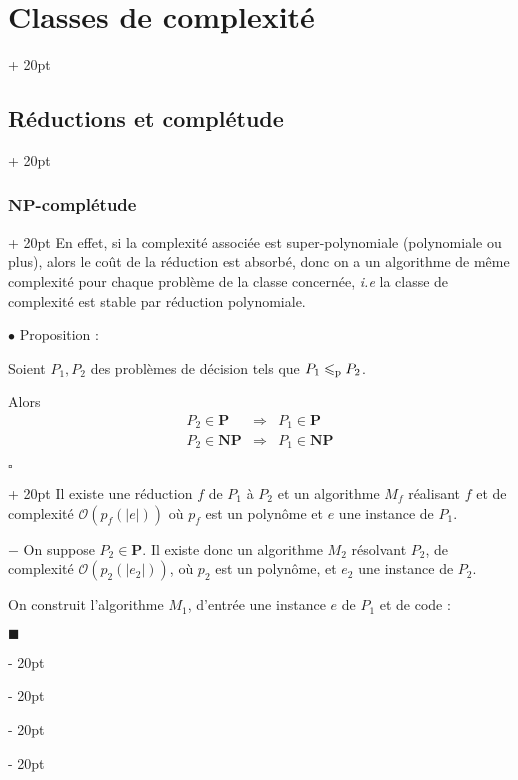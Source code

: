 \documentclass[a4paper, 12pt, twoside]{article}
\newenvironment{indalgo}[2][H]{
    \begin{algoBox}
        \begin{algorithm}[#1]
            \caption{#2}
}
{
        \end{algorithm}
    \end{algoBox}
}
\newcommand{\abs}[1]{\left\lvert #1 \right\rvert}
\renewcommand{\le}{\leqslant}
\newcommand{\ind}[1][20pt]{\advance\leftskip + #1}
\newcommand{\deind}[1][20pt]{\advance\leftskip - #1}
\newenvironment{indt}[2][20pt]{#2 \par \ind[#1]}{\par \deind} %
\newenvironment{proof}[1][{}]{\begin{indt}{$\square$ #1}}{$\blacksquare$ \end{indt}}
\begin{document}
\begin{indt}{\section{Classes de complexité}}
\begin{indt}{\subsection{Réductions et complétude}}
\begin{indt}{\subsubsection{$\mathbf{NP}$-complétude}}
                En effet, si la complexité associée est super-polynomiale (polynomiale ou plus), alors le coût de la réduction est absorbé, donc on a un algorithme de même complexité pour chaque problème de la classe concernée, \textit{i.e} la classe de complexité est stable par réduction polynomiale.

                \vspace{12pt}
                
                $\bullet$ Proposition :
                \begin{emphBox}
                    Soient $P_1, P_2$ des problèmes de décision tels que $P_1 \le_{\rm p} P_2$.
                    
                    Alors
                    \[
                        \begin{array}{rcl}
                            P_2 \in \mathbf{P} &\Rightarrow& P_1 \in \mathbf{P}
                            \\
                            P_2 \in \mathbf{NP} &\Rightarrow& P_1 \in \mathbf{NP}
                        \end{array}
                    \]
                \end{emphBox}

                \vspace{6pt}
                
                \begin{proof}
                    Il existe une réduction $f$ de $P_1$ à $P_2$ et un algorithme $M_f$ réalisant $f$ et de complexité $\mathcal O(p_f(\abs e))$ où $p_f$ est un polynôme et $e$ une instance de $P_1$.

                    \vspace{6pt}
                    
                    $-$ On suppose $P_2 \in \mathbf P$. Il existe donc un algorithme $M_2$ résolvant $P_2$, de complexité $\mathcal O(p_2(\abs{e_2}))$, où $p_2$ est un polynôme, et $e_2$ une instance de $P_2$.

                    On construit l'algorithme $M_1$, d'entrée une instance $e$ de $P_1$  et de code :
                    \begin{indalgo}{$M_1$}

                        \BlankLine


\end{indalgo}
\end{proof}
\end{indt}
\end{indt}
\end{indt}
\end{document}
